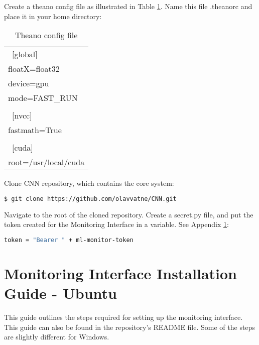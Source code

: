 \noindent  Create a theano config file as illustrated in Table \ref{tab:install_theano_config_file}. Name this file .theanorc and place it in your home directory:\\

\FloatBarrier
\begin{table}[!htbp]
\caption{Theano config file}
\begin{center}
\begin{adjustbox}{max width=\textwidth}
\begin{tabular}{ l }
  \hline			
  ~[global] \\
  floatX=float32 \\
  device=gpu \\
  mode=FAST\_RUN \\
  \\
  ~[nvcc] \\
  fastmath=True \\
  \\
  ~[cuda] \\
  root=/usr/local/cuda \\
  \hline  
\end{tabular}
\end{adjustbox}
\end{center}
\label{tab:install_theano_config_file}
\end{table}
\FloatBarrier

\noindent Clone CNN repository, which contains the core system:
\begin{lstlisting}[language=bash]
  $ git clone https://github.com/olavvatne/CNN.git 
\end{lstlisting}

\noindent Navigate to the root of the cloned repository. Create a secret.py file, and put the token created for the Monitoring Interface in a variable. See Appendix \ref{app:monitorInstall}:
\begin{lstlisting}[language=bash]
  token = "Bearer " + ml-monitor-token
\end{lstlisting}

\section{Monitoring Interface Installation Guide - Ubuntu}
\label{app:monitorInstall}
This guide outlines the steps required for setting up the monitoring interface. This guide can also be found in the repository's README file. Some of the steps are slightly different for Windows. \\

